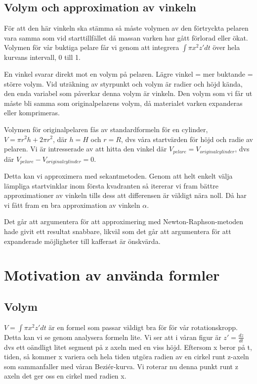 \documentclass[a4paper,10pt]{article}
\begin{document}
	\subsection{Volym och approximation av vinkeln}
	För att den här vinkeln ska stämma så måste volymen av den förtryckta pelaren vara samma som vid starttillfället då massan varken har gått förlorad eller ökat. Volymen för vår buktiga pelare får vi genom att integrera $ \int \pi x^2 z' dt $ över hela kurvans intervall, 0 till 1. 

	En vinkel svarar direkt mot en volym på pelaren. Lägre vinkel = mer buktande = större volym. Vid uträkning av styrpunkt och volym är radier och höjd kända, den enda variabel som påverkar denna volym är vinkeln. Den volym som vi får ut måste bli samma som originalpelarens volym, då materialet varken expanderas eller komprimeras.

	Volymen för originalpelaren fås av standardformeln för en cylinder, $ V=\pi r^2h + 2\pi r^2 $, där $h = H$ och $r = R$, dvs våra startvärden för höjd och radie av pelaren. Vi är intresserade av att hitta den vinkel där $V_{pelare} = V_{originalcylinder}$, dvs där $V_{pelare}-V_{originalcylinder} = 0$.

	Detta kan vi approximera med sekantmetoden. Genom att helt enkelt välja lämpliga startvinklar inom första kvadranten så itererar vi fram bättre approximationer av vinkeln tills dess att differensen är väldigt nära noll. Då har vi fått fram en bra approximation av vinkeln $\alpha$.

	\vspace{3mm}

	Det går att argumentera för att approximering med Newton-Raphson-metoden hade givit ett resultat snabbare, likväl som det går att argumentera för att expanderade möjligheter till kafferast är önskvärda.

\section{Motivation av använda formler}

\subsection{Volym}
$V=\int \pi x^2 z' dt$ är en formel som passar väldigt bra för för vår rotationskropp. Detta kan vi se genom analysera formeln lite. Vi ser att i våran figur är $z'=\frac{dz}{dt}$ dvs ett oändligt litet segment på z axeln med en viss höjd. Eftersom x beror på t, tiden, så kommer x variera och hela tiden utgöra radien av en cirkel runt z-axeln som sammanfaller med våran Beziér-kurva. Vi roterar nu denna punkt runt z axeln det ger oss en cirkel med radien x. \\
\end{document}
